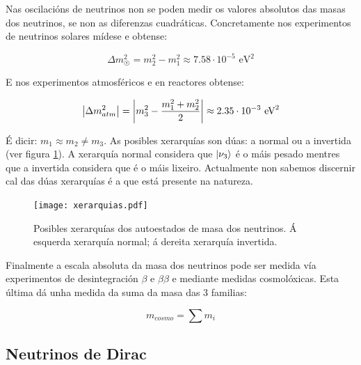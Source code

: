 \documentclass[a4paper,12pt]{article}
\begin{document}
Nas oscilacións de neutrinos non se poden medir os valores absolutos das masas dos neutrinos, se non as diferenzas cuadráticas. Concretamente nos experimentos de neutrinos solares mídese e obtense:

$$ \Delta m_{\astrosun}^2 = m_2^2-m_1^2 \approx 7.58 \cdot 10^{-5} \text{ eV}^2 $$

E nos experimentos atmosféricos e en reactores obtense:

$$ \left|  \Delta m_{atm}^2 \right| = \left|  m_3^2 - \frac{m_1^2+m_2^2}{2}  \right| \approx 2.35 \cdot 10^{-3} \text{ eV}^2$$

É dicir: $m_1 \approx m_2 \neq m_3$. As posibles xerarquías son dúas: a normal ou a invertida (ver figura \ref{xerarquias}). A xerarquía normal considera que $\lvert \nu_3 \rangle$ é o máis pesado mentres que a invertida considera que é o máis lixeiro. Actualmente non sabemos discernir cal das dúas xerarquías é a que está presente na natureza. %
%

\begin{figure}[!]
\centering
\texttt{[image: xerarquias.pdf]}
\caption{Posibles xerarquías dos autoestados de masa dos neutrinos. Á esquerda xerarquía normal; á dereita xerarquía invertida.}
\label{xerarquias}
\end{figure}

Finalmente a escala absoluta da masa dos neutrinos pode ser medida vía experimentos de desintegración $\beta$ e $\beta\beta$ e mediante medidas cosmolóxicas. Esta última dá unha medida da suma da masa das 3 familias:

$$ m_{cosmo} = \sum m_i $$

\subsection{Neutrinos de Dirac}\label{Dirac}
\end{document}

